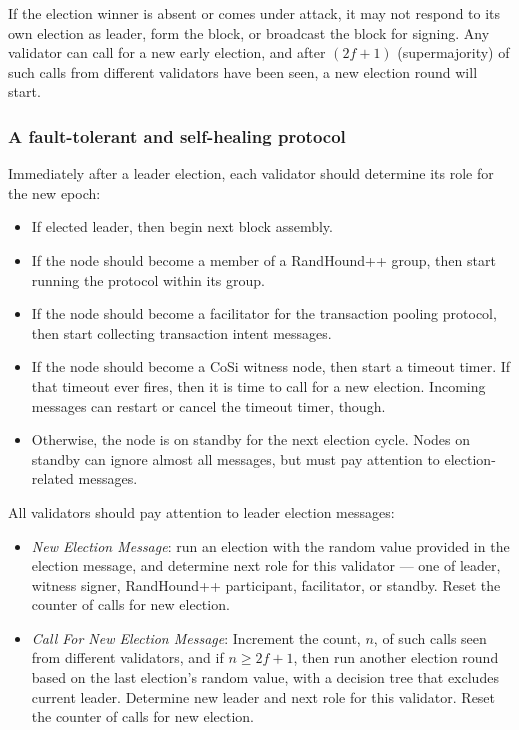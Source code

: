 \documentclass[a4paper, 10pt, conference]{ieeeconf}
\begin{document}
If the election winner is absent or comes under attack, it may not respond to its own election as leader, form the block, or broadcast the block for signing. Any validator can call for a new early election, and after $(2 f+1)$ (supermajority) of such calls from different validators have been seen, a new election round will start.

\subsubsection{A fault-tolerant and self-healing protocol} Immediately after a leader election, each validator should determine its role for the new epoch:

\begin{itemize}
	\item If elected leader, then begin next block assembly. 
	\item If the node should become a member of a RandHound++ group, then start running the protocol within its group.
	\item If the node should become a facilitator for the transaction pooling protocol, then start collecting transaction intent messages.
	\item If the node should become a CoSi witness node, then start a timeout timer. If that timeout ever fires, then it is time to call for a new election. Incoming messages can restart or cancel the timeout timer, though.
	\item Otherwise, the node is on standby for the next election cycle. Nodes on standby can ignore almost all messages, but must pay attention to election-related messages.
\end{itemize}  

All validators should pay attention to leader election messages:

\begin{itemize}
	\item{\textit{New Election Message}: run an election with the random value provided in the election message, and determine next role for this validator --- one of leader, witness signer, RandHound++ participant, facilitator, or standby. Reset the counter of calls for new election.}
	\item{\textit{Call For New Election Message}: Increment the count, $n$, of such calls seen from different validators, and if $n \ge 2 f +1$, then run another election round based on the last election's random value, with a decision tree that excludes current leader. Determine new leader and next role for this validator. Reset the counter of calls for new election.}
\end{itemize}
\end{document}
